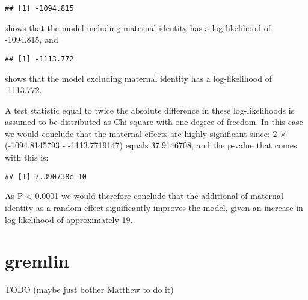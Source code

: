 \documentclass[12pt,]{book}
\newenvironment{Shaded}{\begin{snugshade}}{\end{snugshade}}
\newcommand{\DecValTok}[1]{\textcolor[rgb]{0.00,0.00,0.81}{#1}}
\newcommand{\KeywordTok}[1]{\textcolor[rgb]{0.13,0.29,0.53}{\textbf{#1}}}
\newcommand{\NormalTok}[1]{#1}
\newcommand{\OperatorTok}[1]{\textcolor[rgb]{0.81,0.36,0.00}{\textbf{#1}}}
\newcommand{\StringTok}[1]{\textcolor[rgb]{0.31,0.60,0.02}{#1}}
\begin{document}
\begin{verbatim}
## [1] -1094.815
\end{verbatim}

shows that the model including maternal identity has a log-likelihood of -1094.815, and

\begin{Shaded}
\end{Shaded}

\begin{verbatim}
## [1] -1113.772
\end{verbatim}

shows that the model excluding maternal identity has a log-likelihood of -1113.772.

A test statistic equal to twice the absolute difference in these log-likelihoods is assumed to be distributed as Chi square with one degree of freedom. In this case we would conclude that the maternal effects are highly significant since:
2 \(\times\) (-1094.8145793 - -1113.7719147) equals 37.9146708, and the p-value that comes with this is:

\begin{Shaded}
\end{Shaded}

\begin{verbatim}
## [1] 7.390738e-10
\end{verbatim}

As P \textless{} 0.0001 we would therefore conclude that the additional of maternal identity as a random effect significantly improves the model, given an increase in log-likelihood of approximately 19.

\hypertarget{gremlin-1}{%
\section{gremlin}\label{gremlin-1}}

TODO (maybe just bother Matthew to do it)
\end{document}
